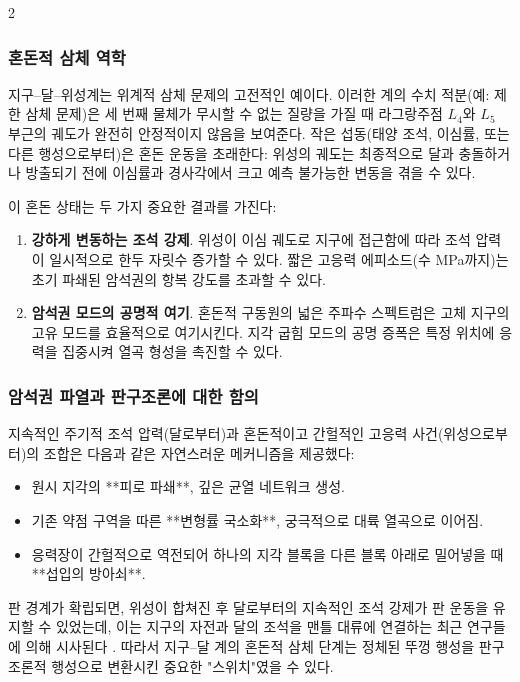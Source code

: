 \documentclass[12pt,a4paper]{article}
\begin{document}
\begin{multicols}{2}
		\subsubsection{혼돈적 삼체 역학}
		지구–달–위성계는 위계적 삼체 문제의 고전적인 예이다. 이러한 계의 수치 적분(예: 제한 삼체 문제)은 세 번째 물체가 무시할 수 없는 질량을 가질 때 라그랑주점 \(L_{4}\)와 \(L_{5}\) 부근의 궤도가 완전히 안정적이지 않음을 보여준다. 작은 섭동(태양 조석, 이심률, 또는 다른 행성으로부터)은 혼돈 운동을 초래한다: 위성의 궤도는 최종적으로 달과 충돌하거나 방출되기 전에 이심률과 경사각에서 크고 예측 불가능한 변동을 겪을 수 있다.
		
		이 혼돈 상태는 두 가지 중요한 결과를 가진다:
		\begin{enumerate}
			\item \textbf{강하게 변동하는 조석 강제}. 위성이 이심 궤도로 지구에 접근함에 따라 조석 압력이 일시적으로 한두 자릿수 증가할 수 있다. 짧은 고응력 에피소드(수 MPa까지)는 초기 파쇄된 암석권의 항복 강도를 초과할 수 있다.
			\item \textbf{암석권 모드의 공명적 여기}. 혼돈적 구동원의 넓은 주파수 스펙트럼은 고체 지구의 고유 모드를 효율적으로 여기시킨다. 지각 굽힘 모드의 공명 증폭은 특정 위치에 응력을 집중시켜 열곡 형성을 촉진할 수 있다.
		\end{enumerate}
		
		\subsubsection{암석권 파열과 판구조론에 대한 함의}
		지속적인 주기적 조석 압력(달로부터)과 혼돈적이고 간헐적인 고응력 사건(위성으로부터)의 조합은 다음과 같은 자연스러운 메커니즘을 제공했다:
		\begin{itemize}
			\item 원시 지각의 **피로 파쇄**, 깊은 균열 네트워크 생성.
			\item 기존 약점 구역을 따른 **변형률 국소화**, 궁극적으로 대륙 열곡으로 이어짐.
			\item 응력장이 간헐적으로 역전되어 하나의 지각 블록을 다른 블록 아래로 밀어넣을 때 **섭입의 방아쇠**.
		\end{itemize}
		
		판 경계가 확립되면, 위성이 합쳐진 후 달로부터의 지속적인 조석 강제가 판 운동을 유지할 수 있었는데, 이는 지구의 자전과 달의 조석을 맨틀 대류에 연결하는 최근 연구들에 의해 시사된다 \cite{Rampino2021}. 따라서 지구–달 계의 혼돈적 삼체 단계는 정체된 뚜껑 행성을 판구조론적 행성으로 변환시킨 중요한 "스위치"였을 수 있다.
		

\end{multicols}
\end{document}
